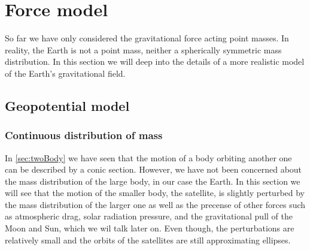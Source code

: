 \documentclass[../main.tex]{subfiles}
\begin{document}
\section{Force model}\label{sec:force}
So far we have only considered the gravitational force acting point masses. In reality, the Earth is not a point mass, neither a spherically symmetric mass distribution. In this section we will deep into the details of a more realistic model of the Earth's gravitational field.
\subsection{Geopotential model}
\subsubsection{Continuous distribution of mass}
In \cref{sec:twoBody} we have seen that the motion of a body orbiting another one can be described by a conic section. However, we have not been concerned about the mass distribution of the large body, in our case the Earth. In this section we will see that the motion of the smaller body, the satellite, is slightly perturbed by the mass distribution of the larger one as well as the precense of other forces such as atmospheric drag, solar radiation pressure, and the gravitational pull of the Moon and Sun, which we wil talk later on. Even though, the perturbations are relatively small and the orbits of the satellites are still approximating ellipses.
\end{document}
